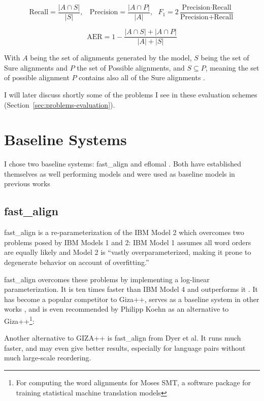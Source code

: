 \[
	\text{Recall} = \frac{|A\cap S|}{|S|},~~~~\text{Precision}  = \frac{|A\cap P|}{|A|},~~~F_1 = 2\frac{\text{Precision}\cdot\text{Recall}}{\text{Precision}+\text{Recall}}
\]

\[
	\text{AER} = 1- \frac{|A\cap S|+|A\cap P|}{|A|+|S|}
\]

With $A$ being the set of alignments generated by the model, $S$ being the set of Sure alignments and $P$ the set of Possible alignments, and $S \subseteq P$, meaning the set of possible alignment $P$ contains also all of the Sure alignments \autocite{och-ney-2000-improved}.

I will later discuss shortly some of the problems I see in these evaluation schemes (Section~\ref{sec:problems-evaluation}).


\section{Baseline Systems}
I chose two baseline systems: fast\_align \autocite{dyer-etal-2013-simple} and eflomal \autocite{Ostling2016efmaral}. 
Both have established themselves as well performing models and were used as baseline models in previous works \autocites{Ostling2016efmaral,jalili-sabet-etal-2020-simalign,steingrimsson-etal-2021-combalign}

\subsection{fast\_align}
fast\_align is a re-parameterization of the IBM Model 2 which overcomes two problems posed by IBM Models 1 and 2: 
IBM Model 1 assumes all word orders are equally likely and Model 2 is \enquote{vastly overparameterized, making it prone to degenerate behavior on account of overfitting.} \autocite{dyer-etal-2013-simple} 

fast\_align overcomes these problems by implementing a log-linear parameterization. It is ten times faster than IBM Model 4 and outperforms it \autocite{dyer-etal-2013-simple}.
It has become a popular competitor to Giza++, serves as a baseline system in other works \autocites{Ostling2016efmaral,jalili-sabet-etal-2020-simalign}, and is even recommended by Philipp Koehn as an alternative to Giza++\footnote{For computing the word alignments for Moses SMT, a software package for training statistical machine translation models}:



\begin{displayquote}
Another alternative to GIZA++ is fast\_align from Dyer et al. It runs much faster, and may even give better results, especially for language pairs without much large-scale reordering. \autocite[115]{koehn-moses-smt-2022}
\end{displayquote}
 

